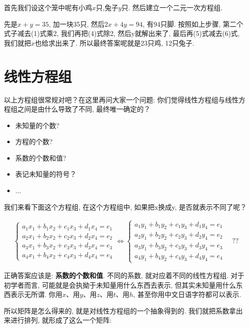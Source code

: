 首先我们设这个笼中呢有小鸡$x$只,兔子$y$只. 然后建立一个二元一次方程组. 

先是$x+y=35$, 加一块35只, 然后$2x+4y=94$, 有94只脚. 按照如上步骤, 第二个式子减去(1)式乘2, 我们再把(4)式除2, 然后y就解出来了, 最后再(5)式减去(6)式, 我们就把$x$也给求出来了. 所以最终答案呢就是23只鸡, 12只兔子. 

\section{线性方程组}

以上方程组很常规对吧？在这里再问大家一个问题: 你们觉得线性方程组与线性方程组之间是由什么导致了不同, 最终唯一确定的？

\begin{itemize}
  \item 未知量的个数?
  \item 方程的个数?
  \item 系数的个数和值?
  \item 表记未知量的符号？
  \item ...
\end{itemize}

我们来看下面这个方程组, 在这个方程组中, 如果把x换成y, 是否就表示不同了呢？

\begin{align*}
	\begin{cases}
		a_1x_1+b_1x_2+c_1x_3+d_1x_4=e_1 \\
		a_2x_1+b_2x_2+c_2x_3+d_2x_4=e_2 \\
		a_3x_1+b_3x_2+c_3x_3+d_3x_4=e_3 \\
		a_4x_1+b_4x_2+c_4x_3+d_4x_4=e_4 
	\end{cases}
  \iff 
  \begin{cases}
		a_1y_1+b_1y_2+c_1y_3+d_1y_4=e_1 \\
		a_2y_1+b_2y_2+c_2y_3+d_2y_4=e_2 \\
		a_3y_1+b_3y_2+c_3y_3+d_3y_4=e_3 \\
		a_4y_1+b_4y_2+c_4y_3+d_4y_4=e_4 
	\end{cases}
  \quad ??
\end{align*}

正确答案应该是: \textbf{系数的个数和值}. 不同的系数, 就对应着不同的线性方程组. 对于初学者而言, 可能就是会执拗于未知量用什么东西去表示, 但其实未知量用什么东西表示无所谓. 你用$x$、用$y$、用$z$、用$t$、用$h$, 甚至你用中文日语字符都可以表示. 

所以矩阵是怎么得来的, 就是对线性方程组的一个抽象得到的. 我们就把系数拿出来进行排列, 就形成了这么一个矩阵:

